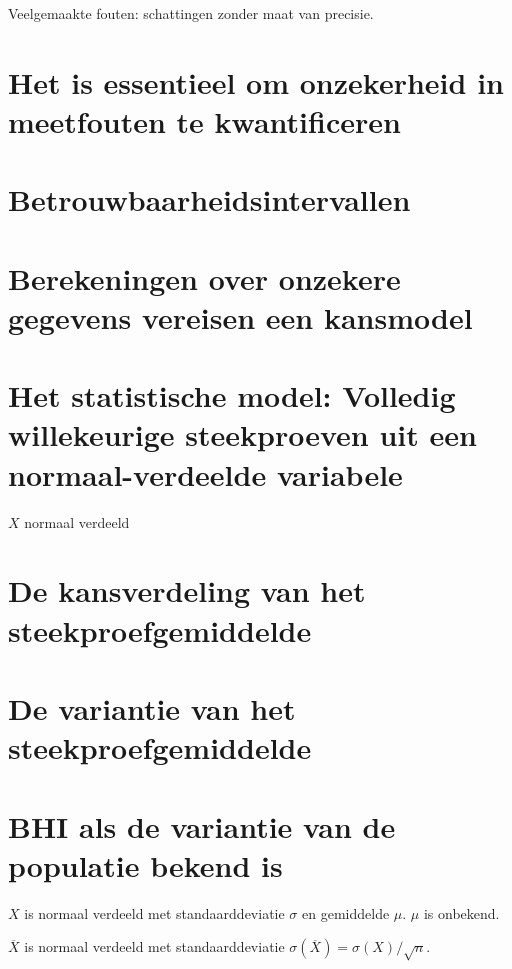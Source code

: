 \documentclass[
  a4paper,
]{scrbook}
\theoremstyle{definition}
\theoremstyle{definition}
\theoremstyle{remark}
\begin{document}
Veelgemaakte fouten: schattingen zonder maat van precisie.

\section{Het is essentieel om onzekerheid in meetfouten te
kwantificeren}\label{het-is-essentieel-om-onzekerheid-in-meetfouten-te-kwantificeren}

\section{Betrouwbaarheidsintervallen}\label{betrouwbaarheidsintervallen}

\section{Berekeningen over onzekere gegevens vereisen een
kansmodel}\label{berekeningen-over-onzekere-gegevens-vereisen-een-kansmodel}

\section{Het statistische model: Volledig willekeurige steekproeven uit
een normaal-verdeelde
variabele}\label{het-statistische-model-volledig-willekeurige-steekproeven-uit-een-normaal-verdeelde-variabele}

\(X\) normaal verdeeld

\section{De kansverdeling van het
steekproefgemiddelde}\label{de-kansverdeling-van-het-steekproefgemiddelde}

\section{De variantie van het
steekproefgemiddelde}\label{de-variantie-van-het-steekproefgemiddelde}

\section{BHI als de variantie van de populatie bekend
is}\label{bhi-als-de-variantie-van-de-populatie-bekend-is}

\(X\) is normaal verdeeld met standaarddeviatie \(\sigma\) en gemiddelde
\(\mu\). \(\mu\) is onbekend.

\(\overline{X}\) is normaal verdeeld met standaarddeviatie
\(\sigma\left(\overline{X}\right) = \sigma(X)/\sqrt{n}\).
\end{document}
